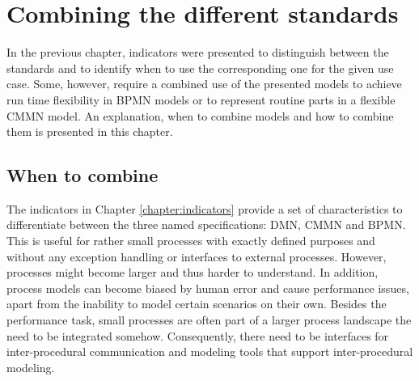 \chapter{Combining the different standards}
\label{chapter:combination}

In the previous chapter, indicators were presented to distinguish between the standards and to identify when to use the corresponding one for the given use case. Some, however, require a combined use of the presented models to achieve run time flexibility in BPMN models or to represent routine parts in a flexible CMMN model. An explanation, when to combine models and how to combine them is presented in this chapter. 
\section{When to combine}
The indicators in Chapter \ref{chapter:indicators} provide a set of characteristics to differentiate between the three named specifications: DMN, CMMN and BPMN. This is useful for rather small processes with exactly defined purposes and without any exception handling or interfaces to external processes. However, processes might become larger and thus harder to understand. In addition, process models can become biased by human error and cause performance issues, apart from the inability to model certain scenarios on their own. Besides the performance task, small processes are often part of a larger process landscape the need to be integrated somehow. Consequently, there need to be  interfaces for inter-procedural communication and modeling tools that support inter-procedural modeling. \\

